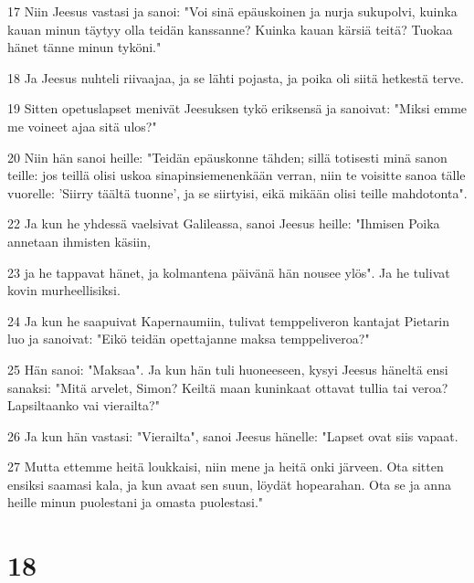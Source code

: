 \par 17 Niin Jeesus vastasi ja sanoi: "Voi sinä epäuskoinen ja nurja sukupolvi, kuinka kauan minun täytyy olla teidän kanssanne? Kuinka kauan kärsiä teitä? Tuokaa hänet tänne minun tyköni."
\par 18 Ja Jeesus nuhteli riivaajaa, ja se lähti pojasta, ja poika oli siitä hetkestä terve.
\par 19 Sitten opetuslapset menivät Jeesuksen tykö eriksensä ja sanoivat: "Miksi emme me voineet ajaa sitä ulos?"
\par 20 Niin hän sanoi heille: "Teidän epäuskonne tähden; sillä totisesti minä sanon teille: jos teillä olisi uskoa sinapinsiemenenkään verran, niin te voisitte sanoa tälle vuorelle: 'Siirry täältä tuonne', ja se siirtyisi, eikä mikään olisi teille mahdotonta".
\par 22 Ja kun he yhdessä vaelsivat Galileassa, sanoi Jeesus heille: "Ihmisen Poika annetaan ihmisten käsiin,
\par 23 ja he tappavat hänet, ja kolmantena päivänä hän nousee ylös". Ja he tulivat kovin murheellisiksi.
\par 24 Ja kun he saapuivat Kapernaumiin, tulivat temppeliveron kantajat Pietarin luo ja sanoivat: "Eikö teidän opettajanne maksa temppeliveroa?"
\par 25 Hän sanoi: "Maksaa". Ja kun hän tuli huoneeseen, kysyi Jeesus häneltä ensi sanaksi: "Mitä arvelet, Simon? Keiltä maan kuninkaat ottavat tullia tai veroa? Lapsiltaanko vai vierailta?"
\par 26 Ja kun hän vastasi: "Vierailta", sanoi Jeesus hänelle: "Lapset ovat siis vapaat.
\par 27 Mutta ettemme heitä loukkaisi, niin mene ja heitä onki järveen. Ota sitten ensiksi saamasi kala, ja kun avaat sen suun, löydät hopearahan. Ota se ja anna heille minun puolestani ja omasta puolestasi."

\chapter{18}

